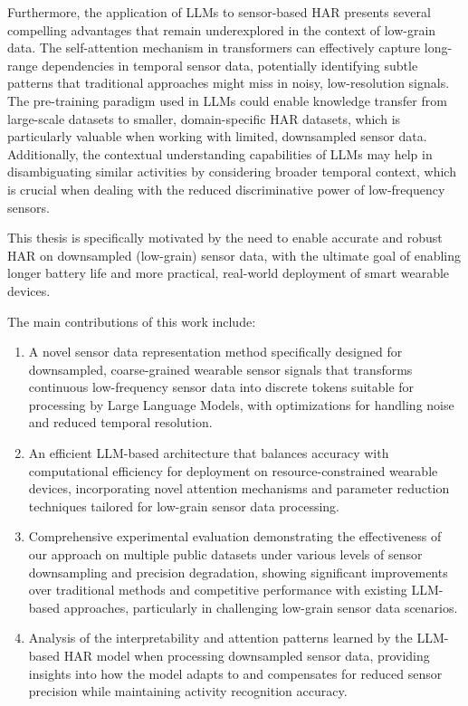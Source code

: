 Furthermore, the application of LLMs to sensor-based HAR presents several compelling advantages that remain underexplored in the context of low-grain data. The self-attention mechanism in transformers can effectively capture long-range dependencies in temporal sensor data, potentially identifying subtle patterns that traditional approaches might miss in noisy, low-resolution signals. The pre-training paradigm used in LLMs could enable knowledge transfer from large-scale datasets to smaller, domain-specific HAR datasets, which is particularly valuable when working with limited, downsampled sensor data. Additionally, the contextual understanding capabilities of LLMs may help in disambiguating similar activities by considering broader temporal context, which is crucial when dealing with the reduced discriminative power of low-frequency sensors.

This thesis is specifically motivated by the need to enable accurate and robust HAR on downsampled (low-grain) sensor data, with the ultimate goal of enabling longer battery life and more practical, real-world deployment of smart wearable devices.

The main contributions of this work include:
\begin{enumerate}
\item A novel sensor data representation method specifically designed for downsampled, coarse-grained wearable sensor signals that transforms continuous low-frequency sensor data into discrete tokens suitable for processing by Large Language Models, with optimizations for handling noise and reduced temporal resolution.
\item An efficient LLM-based architecture that balances accuracy with computational efficiency for deployment on resource-constrained wearable devices, incorporating novel attention mechanisms and parameter reduction techniques tailored for low-grain sensor data processing.
\item Comprehensive experimental evaluation demonstrating the effectiveness of our approach on multiple public datasets under various levels of sensor downsampling and precision degradation, showing significant improvements over traditional methods and competitive performance with existing LLM-based approaches, particularly in challenging low-grain sensor data scenarios.
\item Analysis of the interpretability and attention patterns learned by the LLM-based HAR model when processing downsampled sensor data, providing insights into how the model adapts to and compensates for reduced sensor precision while maintaining activity recognition accuracy.
\end{enumerate}

